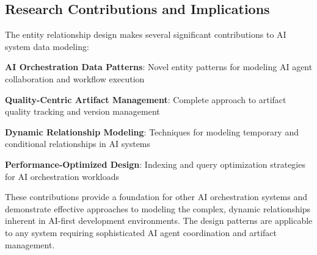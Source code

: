\subsection*{Research Contributions and Implications}

The entity relationship design makes several significant contributions to AI system data modeling:

\begin{expandedlist}
    \item \textbf{AI Orchestration Data Patterns}: Novel entity patterns for modeling AI agent collaboration and workflow execution
    \item \textbf{Quality-Centric Artifact Management}: Complete approach to artifact quality tracking and version management
    \item \textbf{Dynamic Relationship Modeling}: Techniques for modeling temporary and conditional relationships in AI systems
    \item \textbf{Performance-Optimized Design}: Indexing and query optimization strategies for AI orchestration workloads
\end{expandedlist}

These contributions provide a foundation for other AI orchestration systems and demonstrate effective approaches to modeling the complex, dynamic relationships inherent in AI-first development environments. The design patterns are applicable to any system requiring sophisticated AI agent coordination and artifact management.
